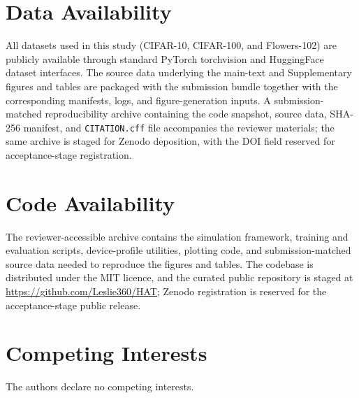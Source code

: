 \section*{Data Availability}
All datasets used in this study (CIFAR-10, CIFAR-100, and Flowers-102) are publicly available through standard PyTorch torchvision and HuggingFace dataset interfaces. The source data underlying the main-text and Supplementary figures and tables are packaged with the submission bundle together with the corresponding manifests, logs, and figure-generation inputs. A submission-matched reproducibility archive containing the code snapshot, source data, SHA-256 manifest, and \texttt{CITATION.cff} file accompanies the reviewer materials; the same archive is staged for Zenodo deposition, with the DOI field reserved for acceptance-stage registration.

\section*{Code Availability}
The reviewer-accessible archive contains the simulation framework, training and evaluation scripts, device-profile utilities, plotting code, and submission-matched source data needed to reproduce the figures and tables. The codebase is distributed under the MIT licence, and the curated public repository is staged at \url{https://github.com/Leslie360/HAT}; Zenodo registration is reserved for the acceptance-stage public release.

\section*{Competing Interests}
The authors declare no competing interests.
